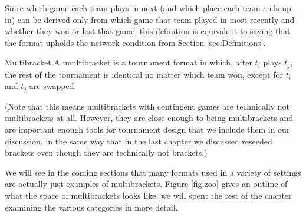 {    Since which game each team plays in next (and which place each team ends up in) can be derived only from which game that team played in most recently and whether they won or lost that game, this definition is equivalent to saying that the format upholds the network condition from Section \ref{sec:Definitions}.

    \begin{definition}{Multibracket}{}
        A \i{multibracket} is a tournament format in which, after $t_i$ plays $t_j$, the rest of the tournament is identical no matter which team won, except for $t_i$ and $t_j$ are swapped.
    \end{definition}

    (Note that this means multibrackets with contingent games are technically not multibrackets at all. However, they are close enough to being multibrackets and are important enough tools for tournament design that we include them in our discussion, in the same way that  in the last chapter we discussed reseeded brackets even though they are technically not brackets.)

    We will see in the coming sections that many formats used in a variety of settings are actually just examples of multibrackets. Figure \ref{fig:zoo} gives an outline of what the space of multibrackets looks like: we will spent the rest of the chapter examining the various categories in more detail.

}











